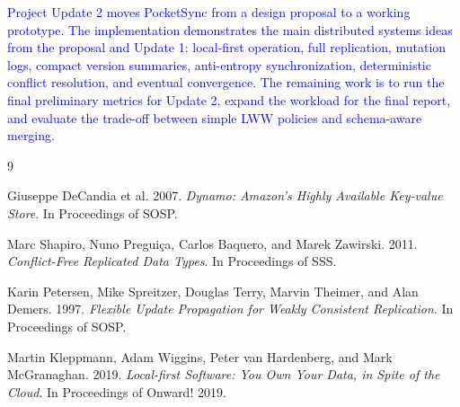 \documentclass[10pt,twocolumn]{article}
\newcommand{\update}[1]{\textcolor{blue}{#1}}
\begin{document}
\update{Project Update 2 moves PocketSync from a design proposal to a working prototype. The implementation demonstrates the main distributed systems ideas from the proposal and Update 1: local-first operation, full replication, mutation logs, compact version summaries, anti-entropy synchronization, deterministic conflict resolution, and eventual convergence. The remaining work is to run the final preliminary metrics for Update 2, expand the workload for the final report, and evaluate the trade-off between simple LWW policies and schema-aware merging.}

\begin{thebibliography}{9}

Giuseppe DeCandia et al. 2007.
\textit{Dynamo: Amazon's Highly Available Key-value Store}.
In Proceedings of SOSP.

Marc Shapiro, Nuno Preguiça, Carlos Baquero, and Marek Zawirski. 2011.
\textit{Conflict-Free Replicated Data Types}.
In Proceedings of SSS.

Karin Petersen, Mike Spreitzer, Douglas Terry, Marvin Theimer, and Alan Demers. 1997.
\textit{Flexible Update Propagation for Weakly Consistent Replication}.
In Proceedings of SOSP.

Martin Kleppmann, Adam Wiggins, Peter van Hardenberg, and Mark McGranaghan. 2019.
\textit{Local-first Software: You Own Your Data, in Spite of the Cloud}.
In Proceedings of Onward! 2019.

\end{thebibliography}
\end{document}
